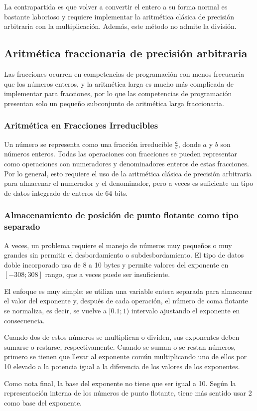 La contrapartida es que volver a convertir el entero a su forma normal es bastante laborioso y requiere implementar la aritmética clásica de precisión arbitraria con la multiplicación. Además, este método no admite la división.

\subsection{Aritmética fraccionaria de precisión arbitraria}

Las fracciones ocurren en competencias de programación con menos frecuencia que los números enteros, y la aritmética larga es mucho más complicada de implementar para fracciones, por lo que las competencias de programación presentan solo un pequeño subconjunto de aritmética larga fraccionaria.

\subsubsection{Aritmética en Fracciones Irreducibles}

Un número se representa como una fracción irreducible $\frac{a}{b}$, donde $a$ y $b$ son números enteros. Todas las operaciones con fracciones se pueden representar como operaciones con numeradores y denominadores enteros de estas fracciones. Por lo general, esto requiere el uso de la aritmética clásica de precisión arbitraria para almacenar el numerador y el denominador, pero a veces es suficiente un tipo de datos integrado de enteros de 64 bits.

\subsubsection{Almacenamiento de posición de punto flotante como tipo separado}

A veces, un problema requiere el manejo de números muy pequeños o muy grandes sin permitir el desbordamiento o subdesbordamiento. El tipo de datos doble incorporado usa de 8 a 10 bytes y permite valores del exponente en $[-308; 308]$ rango, que a veces puede ser insuficiente.

El enfoque es muy simple: se utiliza una variable entera separada para almacenar el valor del exponente y, después de cada operación, el número de coma flotante se normaliza, es decir, se vuelve a $[0.1; 1) $ intervalo ajustando el exponente en consecuencia.

Cuando dos de estos números se multiplican o dividen, sus exponentes deben sumarse o restarse, respectivamente. Cuando se suman o se restan números, primero se tienen que llevar al exponente común multiplicando uno de ellos por 10 elevado a la potencia igual a la diferencia de los valores de los exponentes.

Como nota final, la base del exponente no tiene que ser igual a 10. Según la representación interna de los números de punto flotante, tiene más sentido usar 2 como base del exponente.